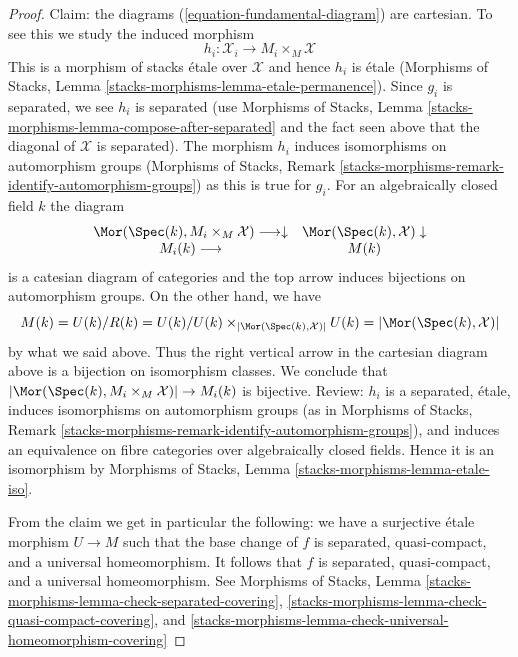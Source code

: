 \begin{proof}
\medskip\noindent
Claim: the diagrams (\ref{equation-fundamental-diagram}) are cartesian.
To see this we study the induced morphism
$$
h_i : \mathcal{X}_i \longrightarrow M_i \times_M \mathcal{X}
$$
This is a morphism of stacks \'etale over $\mathcal{X}$
and hence $h_i$ is \'etale (Morphisms of Stacks, Lemma
\ref{stacks-morphisms-lemma-etale-permanence}).
Since $g_i$ is separated, we see $h_i$ is separated
(use Morphisms of Stacks, Lemma
\ref{stacks-morphisms-lemma-compose-after-separated} and the fact
seen above that the diagonal of $\mathcal{X}$ is separated).
The morphism $h_i$ induces isomorphisms on automorphism groups
(Morphisms of Stacks, Remark
\ref{stacks-morphisms-remark-identify-automorphism-groups})
as this is true for $g_i$. For an algebraically closed field $k$
the diagram
$$
\begin{array}{cc}\Mor(\Spec(k), M_i \times_M \mathcal{X}) \longrightarrow\downarrow & \Mor(\Spec(k), \mathcal{X}) \downarrow \\ M_i(k) \longrightarrow & M(k)\end{array}
$$
is a catesian diagram of categories and the top arrow
induces bijections on automorphism groups.
On the other hand, we have
$$
M(k) = U(k)/R(k) = U(k)/
U(k) \times_{|\Mor(\Spec(k), \mathcal{X})|} U(k) =
|\Mor(\Spec(k), \mathcal{X})|
$$
by what we said above. Thus the right vertical arrow in the
cartesian diagram above is a bijection on isomorphism classes.
We conclude that
$|\Mor(\Spec(k), M_i \times_M \mathcal{X})| \to M_i(k)$ is bijective.
Review: $h_i$ is a separated, \'etale, induces isomorphisms on
automorphism groups (as in Morphisms of Stacks, Remark
\ref{stacks-morphisms-remark-identify-automorphism-groups}), and
induces an equivalence on fibre categories over algebraically closed fields.
Hence it is an isomorphism by Morphisms of Stacks, Lemma
\ref{stacks-morphisms-lemma-etale-iso}.

\medskip\noindent
From the claim we get in particular the following:
we have a surjective \'etale morphism $U \to M$
such that the base change of $f$ is separated, quasi-compact,
and a universal homeomorphism. It follows that $f$ is separated,
quasi-compact, and a universal homeomorphism.
See Morphisms of Stacks, Lemma
\ref{stacks-morphisms-lemma-check-separated-covering},
\ref{stacks-morphisms-lemma-check-quasi-compact-covering}, and
\ref{stacks-morphisms-lemma-check-universal-homeomorphism-covering}


\end{proof}
